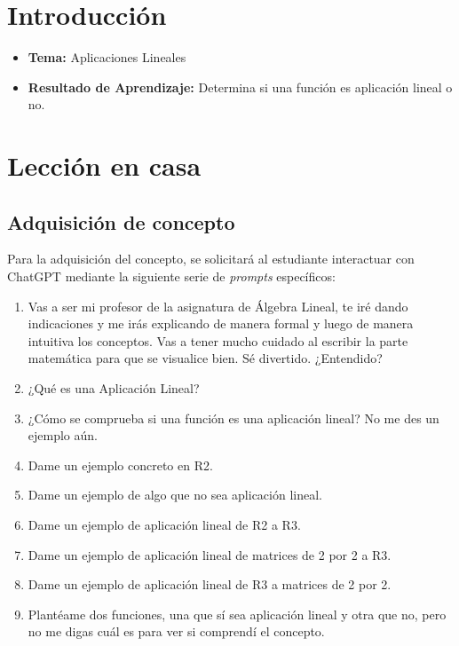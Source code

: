 \documentclass[a4,11pt]{aleph-notas}
\begin{document}
\encabezado

\vspace*{-10mm}
\section*{Introducción}

\begin{itemize}
    \item \textbf{Tema:} Aplicaciones Lineales
    \item \textbf{Resultado de Aprendizaje:} Determina si una función es aplicación lineal o no.
\end{itemize}

\section{Lección en casa}

\subsection{Adquisición de concepto}

Para la adquisición del concepto, se solicitará al estudiante interactuar con ChatGPT mediante la siguiente serie de \textit{prompts} específicos:

\begin{enumerate}[label=\textit{Prompt \arabic*.},leftmargin=2.1cm]
     \item Vas a ser mi profesor de la asignatura de Álgebra Lineal, te iré dando indicaciones y me irás explicando de manera formal y luego de manera intuitiva los conceptos. Vas a tener mucho cuidado al escribir la parte matemática para que se visualice bien. Sé divertido. ¿Entendido?
        \item ¿Qué es una Aplicación Lineal?
        \item ¿Cómo se comprueba si una función es una aplicación lineal? No me des un ejemplo aún.
        \item Dame un ejemplo concreto en R2.
        \item Dame un ejemplo de algo que no sea aplicación lineal.
        \item Dame un ejemplo de aplicación lineal de R2 a R3.
        \item Dame un ejemplo de aplicación lineal de matrices de 2 por 2 a R3.
        \item Dame un ejemplo de aplicación lineal de R3 a matrices de 2 por 2.
        \item Plantéame dos funciones, una que sí sea aplicación lineal y otra que no, pero no me digas cuál es para ver si comprendí el concepto.
\end{enumerate}
\end{document}
